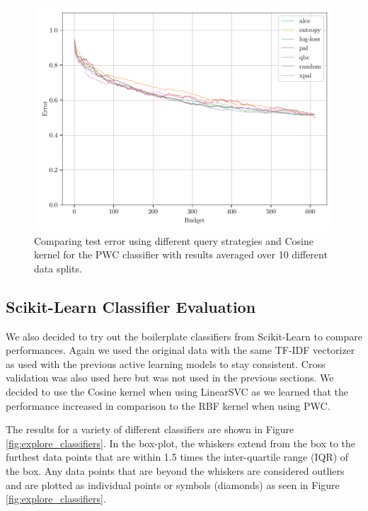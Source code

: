 \begin{figure}[ht]
    \centering
    \includegraphics[width=\textwidth]{../img/plot_kernel_cos_averaged_test_results.pdf}
    \caption{Comparing test error using different query strategies and Cosine kernel for the PWC classifier with results averaged over 10 different data splits.}
    \label{fig:cos_avg_test_results}
\end{figure}


\subsection{Scikit-Learn Classifier Evaluation}

We also decided to try out the boilerplate classifiers from Scikit-Learn to compare performances. Again we used the original data with the same TF-IDF vectorizer as used with the previous active learning models to stay consistent. Cross validation was also used here but was not used in the previous sections. We decided to use the Cosine kernel when using LinearSVC as we learned that the performance increased in comparison to the RBF kernel when using PWC. 

The results for a variety of different classifiers are shown in Figure \ref{fig:explore_classifiers}. In the box-plot, the whiskers extend from the box to the furthest data points that are within 1.5 times the inter-quartile range (IQR) of the box. Any data points that are beyond the whiskers are considered outliers and are plotted as individual points or symbols (diamonds) as seen in Figure \ref{fig:explore_classifiers}.

